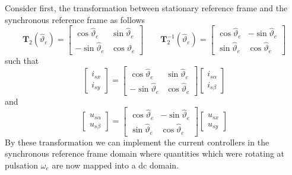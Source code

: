 \documentclass[11pt,a4paper,oneside]{book}
\numberwithin{equation}{section}
\theoremstyle{it}
\theoremstyle{definition}
\begin{document}
Consider first, the transformation between stationary reference frame and the 
synchronous reference frame as follows
\begin{equation}\label{im_control_problem_eq_17}
	\mathbf{T}_2(\hat{\vartheta}_e)=\begin{bmatrix}
		\cos\hat{\vartheta}_e & \sin\hat{\vartheta}_e \\[6pt]
		-\sin\hat{\vartheta}_e & \cos\vartheta_e 
	\end{bmatrix} \qquad
	\mathbf{T}_2^{-1}(\hat{\vartheta}_e)=\begin{bmatrix}
		\cos\hat{\vartheta}_e & -\sin\hat{\vartheta}_e \\[6pt]
		\sin\hat{\vartheta}_e & \cos\hat{\vartheta}_e 
	\end{bmatrix}
\end{equation}
such that
\begin{equation}\label{im_control_problem_eq_18}
	\begin{bmatrix}
		i_{sx} \\[6pt]
		i_{sy}
	\end{bmatrix} = 
	\begin{bmatrix}
		\cos\hat{\vartheta}_e & \sin\hat{\vartheta}_e \\[6pt]
		-\sin\hat{\vartheta}_e & \cos\hat{\vartheta}_e 
	\end{bmatrix}
	\begin{bmatrix}
		i_{s\alpha} \\[6pt]
		i_{s\beta}
	\end{bmatrix}
\end{equation}
and
\begin{equation}\label{im_control_problem_eq_19}
	\begin{bmatrix}
		u_{s\alpha} \\[6pt]
		u_{s\beta}
	\end{bmatrix} = 
	\begin{bmatrix}
		\cos\hat{\vartheta}_e & -\sin\hat{\vartheta}_e \\[6pt]
		\sin\hat{\vartheta}_e & \cos\hat{\vartheta}_e 
	\end{bmatrix}
	\begin{bmatrix}
		u_{sx} \\[6pt]
		u_{sy}
	\end{bmatrix}
\end{equation}
By these transformation we can implement the current controllers in the synchronous 
reference frame domain where quantities which were rotating at pulsation 
$\omega_e$ are now mapped into a dc domain. 
\end{document}
